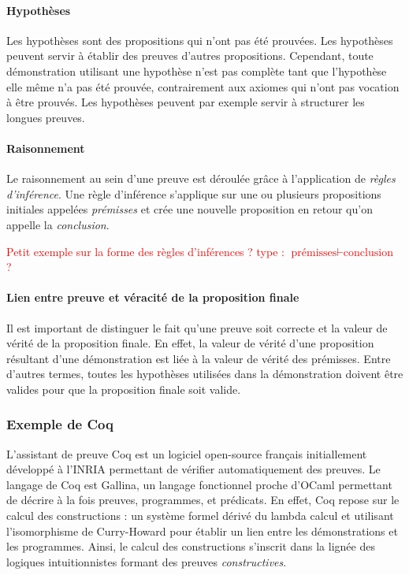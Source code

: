 			\paragraph{Hypothèses} Les hypothèses sont des propositions qui n'ont pas été prouvées. Les hypothèses peuvent servir à établir des preuves d'autres propositions. Cependant, toute démonstration utilisant une hypothèse n'est pas complète tant que l'hypothèse elle même n'a pas été prouvée, contrairement aux axiomes qui n'ont pas vocation à être prouvés. Les hypothèses peuvent par exemple servir à structurer les longues preuves.

			\paragraph{Raisonnement}
			Le raisonnement au sein d'une preuve est déroulée grâce à l'application de \emph{règles d'inférence}. Une règle d'inférence s'applique sur une ou plusieurs propositions initiales appelées \emph{prémisses} et crée une nouvelle proposition en retour qu'on appelle la \emph{conclusion}.

			\textcolor{red}{Petit exemple sur la forme des règles d'inférences ? type : $ \text{prémisses} \vdash \text{conclusion}$ ?}

			\paragraph{Lien entre preuve et véracité de la proposition finale} Il est important de distinguer le fait qu'une preuve soit correcte et la valeur de vérité de la proposition finale. En effet, la valeur de vérité d'une proposition résultant d'une démonstration est liée à la valeur de vérité des prémisses. Entre d'autres termes, toutes les hypothèses utilisées dans la démonstration doivent être valides pour que la proposition finale soit valide.

			\subsubsection{Exemple de Coq}
			L'assistant de preuve Coq est un logiciel open-source français initiallement développé à l'INRIA permettant de vérifier automatiquement des preuves. Le langage de Coq est Gallina, un langage fonctionnel proche d'OCaml permettant de décrire à la fois preuves, programmes, et prédicats. En effet, Coq repose sur le calcul des constructions : un système formel dérivé du lambda calcul et utilisant l'isomorphisme de Curry-Howard pour établir un lien entre les démonstrations et les programmes. Ainsi, le calcul des constructions s'inscrit dans la lignée des logiques intuitionnistes formant des preuves \emph{constructives}. 

